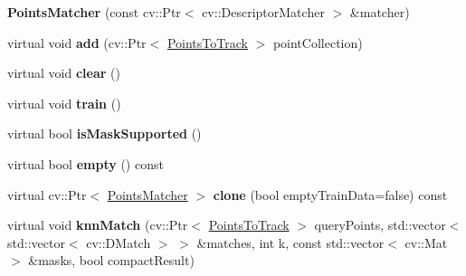 \begin{DoxyCompactItemize}
\item 
\hypertarget{class_opencv_sf_m_1_1_points_matcher_a6e28c42636e34e8c29d255202869598b}{
{\bfseries PointsMatcher} (const cv::Ptr$<$ cv::DescriptorMatcher $>$ \&matcher)}
\label{class_opencv_sf_m_1_1_points_matcher_a6e28c42636e34e8c29d255202869598b}

\item 
\hypertarget{class_opencv_sf_m_1_1_points_matcher_a0f5001301f3cdd4b24f4495dfe307742}{
virtual void {\bfseries add} (cv::Ptr$<$ \hyperlink{class_opencv_sf_m_1_1_points_to_track}{PointsToTrack} $>$ pointCollection)}
\label{class_opencv_sf_m_1_1_points_matcher_a0f5001301f3cdd4b24f4495dfe307742}

\item 
\hypertarget{class_opencv_sf_m_1_1_points_matcher_ac4d214492d8659c36715f79ebb19fc0d}{
virtual void {\bfseries clear} ()}
\label{class_opencv_sf_m_1_1_points_matcher_ac4d214492d8659c36715f79ebb19fc0d}

\item 
\hypertarget{class_opencv_sf_m_1_1_points_matcher_a0772137e424d1cd562d6e6600601d917}{
virtual void {\bfseries train} ()}
\label{class_opencv_sf_m_1_1_points_matcher_a0772137e424d1cd562d6e6600601d917}

\item 
\hypertarget{class_opencv_sf_m_1_1_points_matcher_a4b3d7673ff8e8cdbf1780dda26acd151}{
virtual bool {\bfseries isMaskSupported} ()}
\label{class_opencv_sf_m_1_1_points_matcher_a4b3d7673ff8e8cdbf1780dda26acd151}

\item 
\hypertarget{class_opencv_sf_m_1_1_points_matcher_a29e94f44fd1726cac6833c233145cf3f}{
virtual bool {\bfseries empty} () const }
\label{class_opencv_sf_m_1_1_points_matcher_a29e94f44fd1726cac6833c233145cf3f}

\item 
\hypertarget{class_opencv_sf_m_1_1_points_matcher_a340a5cfae0d6cb8cb68f1fa77ec89993}{
virtual cv::Ptr$<$ \hyperlink{class_opencv_sf_m_1_1_points_matcher}{PointsMatcher} $>$ {\bfseries clone} (bool emptyTrainData=false) const }
\label{class_opencv_sf_m_1_1_points_matcher_a340a5cfae0d6cb8cb68f1fa77ec89993}

\item 
\hypertarget{class_opencv_sf_m_1_1_points_matcher_a922a829860b62c362b9de2344add8ec3}{
virtual void {\bfseries knnMatch} (cv::Ptr$<$ \hyperlink{class_opencv_sf_m_1_1_points_to_track}{PointsToTrack} $>$ queryPoints, std::vector$<$ std::vector$<$ cv::DMatch $>$ $>$ \&matches, int k, const std::vector$<$ cv::Mat $>$ \&masks, bool compactResult)}
\label{class_opencv_sf_m_1_1_points_matcher_a922a829860b62c362b9de2344add8ec3}


\end{DoxyCompactItemize}
